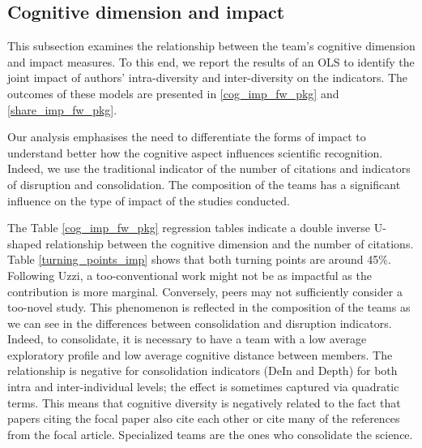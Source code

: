 


\subsection{Cognitive dimension and impact}

This subsection examines the relationship between the team's cognitive dimension and impact measures. To this end, we report the results of an OLS to identify the joint impact of authors' intra-diversity and inter-diversity on the indicators. The outcomes of these models are presented in \ref{cog_imp_fw_pkg} and \ref{share_imp_fw_pkg}. 

Our analysis emphasises the need to differentiate the forms of impact to understand better how the cognitive aspect influences scientific recognition. Indeed, we use the traditional indicator of the number of citations and indicators of disruption and consolidation. The composition of the teams has a significant influence on the type of impact of the studies conducted.


The Table \ref{cog_imp_fw_pkg} regression tables indicate a double inverse U-shaped relationship between the cognitive dimension and the number of citations. Table \ref{turning_points_imp} shows that both turning points are around 45\%. Following Uzzi, a too-conventional work might not be as impactful as the contribution is more marginal. Conversely, peers may not sufficiently consider a too-novel study. This phenomenon is reflected in the composition of the teams as we can see in the differences between consolidation and disruption indicators. Indeed, to consolidate, it is necessary to have a team with a low average exploratory profile and low average cognitive distance between members. The relationship is negative for consolidation indicators (DeIn and Depth) for both intra and inter-individual levels; the effect is sometimes captured via quadratic terms. This means that cognitive diversity is negatively related to the fact that papers citing the focal paper also cite each other or cite many of the references from the focal article. Specialized teams are the ones who consolidate the science.



